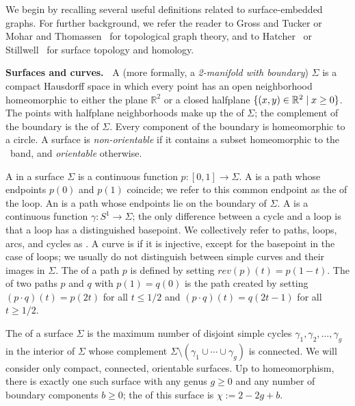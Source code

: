 \documentclass[twoside,leqno,twocolumn]{article}
\def\rev{\mathit{rev}}
\def\Real{\mathbb{R}}
\def\fakeparagraph#1{\par\medskip\noindent\textbf{#1}}
\begin{document}
We begin by recalling several useful definitions related to surface-embedded graphs.  For further background, we refer the reader to Gross and Tucker \cite{gt-tgt-01} or Mohar and Thomassen~\cite{mt-gs-01} for topological graph theory, and to Hatcher~\cite{h-at-01} or Stillwell~\cite{s-ctcgt-93} for surface topology and homology.

\fakeparagraph{Surfaces and curves.~}
A  (more formally, a \emph{2-manifold with boundary}) $\Sigma$ is a compact Hausdorff space in which every point has an open neighborhood homeomorphic to either the plane $\Real^2$ or a closed halfplane $\set{(x,y)\in \Real^2\mid x\ge 0}$.  The points with halfplane neighborhoods make up the  of $\Sigma$; the complement of the boundary is the  of $\Sigma$.  Every component of the boundary is homeomorphic to a circle.  A surface is \emph{non-orientable} if it contains a subset homeomorphic to the \Mobius\ band, and \emph{orientable} otherwise.

A  in a surface $\Sigma$ is a continuous function $p\colon [0,1]\to\Sigma$.  A  is a path whose endpoints $p(0)$ and $p(1)$ coincide; we refer to this common endpoint as the  of the loop.  An  is a path whose endpoints lie on the boundary of $\Sigma$.  A  is a continuous function $\gamma\colon S^1\to\Sigma$; the only difference between a cycle and a loop is that a loop has a distinguished basepoint.  We collectively refer to paths, loops, arcs, and cycles as .  A curve is  if it is injective, except for the basepoint in the case of loops; we usually do not distinguish between simple curves and their images in $\Sigma$.  The \EMPH{reversal $\rev(p)$} of a path $p$ is defined by setting $\rev(p)(t) = p(1-t)$.  The  of two paths $p$ and $q$ with $p(1) = q(0)$ is the path created by setting $(p\cdot q)(t) = p(2t)$ for all $t \le 1/2$ and $(p\cdot q)(t) = q(2t-1)$ for all $t \ge 1/2$.

The  of a surface $\Sigma$ is the maximum number of disjoint simple cycles $\gamma_1, \gamma_2, \dots, \gamma_g$ in the interior of $\Sigma$ whose complement $\Sigma\setminus(\gamma_1\cup\cdots\cup\gamma_g)$ is connected.  We will consider only compact, connected, orientable surfaces.  Up to homeomorphism, there is exactly one such surface with any genus $g\ge 0$ and any number of boundary components $b\ge 0$; the  of this surface is $\chi := 2-2g+b$.
\end{document}
